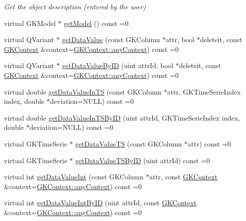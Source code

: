 \begin{DoxyCompactItemize}
\begin{DoxyCompactList}\small\item\em Get the object description (entered by the user) \end{DoxyCompactList}\item 
virtual G\+K\+Model $\ast$ \hyperlink{classGKBaseObject_ac277f8125f58f40abc059d648cd67978}{get\+Model} () const =0
\item 
virtual Q\+Variant $\ast$ \hyperlink{classGKBaseObject_ae88f397d9b9f2b4a9de0d82ebf49407e}{get\+Data\+Value} (const G\+K\+Column $\ast$attr, bool $\ast$deleteit, const \hyperlink{classGKContext}{G\+K\+Context} \&context=\hyperlink{classGKContext_a37de2dc1b6bab087b9b92a445922e79d}{G\+K\+Context\+::any\+Context}) const =0
\item 
virtual Q\+Variant $\ast$ \hyperlink{classGKBaseObject_afe167f2a87468c8f4a1b639cdd9201e0}{get\+Data\+Value\+By\+ID} (uint attr\+Id, bool $\ast$deleteit, const \hyperlink{classGKContext}{G\+K\+Context} \&context=\hyperlink{classGKContext_a37de2dc1b6bab087b9b92a445922e79d}{G\+K\+Context\+::any\+Context}) const =0
\item 
virtual double \hyperlink{classGKBaseObject_a60409cd3407257cde924579760db4ac9}{get\+Data\+Value\+In\+TS} (const G\+K\+Column $\ast$attr, G\+K\+Time\+Serie\+Index index, double $\ast$deviation=N\+U\+LL) const =0
\item 
virtual double \hyperlink{classGKBaseObject_ab95510cc5f255eab3d53003ee0100eb6}{get\+Data\+Value\+In\+T\+S\+By\+ID} (uint attr\+Id, G\+K\+Time\+Serie\+Index index, double $\ast$deviation=N\+U\+LL) const =0
\item 
virtual G\+K\+Time\+Serie $\ast$ \hyperlink{classGKBaseObject_a655fa8e6246dab899e22a79c9fdbd6ec}{get\+Data\+Value\+TS} (const G\+K\+Column $\ast$attr) const =0
\item 
virtual G\+K\+Time\+Serie $\ast$ \hyperlink{classGKBaseObject_ab20dd8504b580a37636e6b71fdaaa5cd}{get\+Data\+Value\+T\+S\+By\+ID} (uint attr\+Id) const =0
\item 
virtual int \hyperlink{classGKBaseObject_a01bcf1a2ff617e84b461bfebb5ddc556}{get\+Data\+Value\+Int} (const G\+K\+Column $\ast$attr, const \hyperlink{classGKContext}{G\+K\+Context} \&context=\hyperlink{classGKContext_a37de2dc1b6bab087b9b92a445922e79d}{G\+K\+Context\+::any\+Context}) const =0
\item 
virtual int \hyperlink{classGKBaseObject_ac68785485ca46410a911ee2db0cfb43c}{get\+Data\+Value\+Int\+By\+ID} (uint attr\+Id, const \hyperlink{classGKContext}{G\+K\+Context} \&context=\hyperlink{classGKContext_a37de2dc1b6bab087b9b92a445922e79d}{G\+K\+Context\+::any\+Context}) const =0

\end{DoxyCompactItemize}
